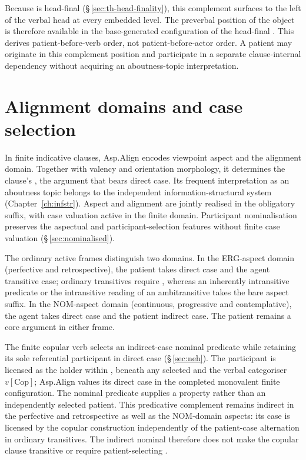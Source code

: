 \noindent Because  is head-final
(§\,\ref{sec:th-head-finality}), this complement surfaces to the left of the
verbal head at every embedded level. The preverbal position of the object is
therefore available in the base-generated configuration of the
head-final . This derives patient-before-verb order, not
patient-before-actor order. A patient may originate in this complement position
and participate in a separate clause-internal dependency without acquiring an
aboutness-topic interpretation.


\section{Alignment domains and case selection}
\label{sec:vm-asp-case}

In finite indicative clauses, Asp.Align encodes viewpoint aspect and the
alignment domain. Together with valency and orientation morphology, it
determines the clause's , the argument that bears
direct case. Its frequent interpretation as an
aboutness topic belongs to the independent information-structural system
(Chapter~\ref{ch:infstr}). Aspect and alignment are jointly realised in the obligatory
suffix, with case valuation active in the finite domain. Participant
nominalisation preserves the aspectual and participant-selection features
without finite case valuation (§\,\ref{sec:nominalised}).

The ordinary active frames distinguish two domains. In the ERG-aspect domain
(perfective and retrospective), the patient takes direct case and the agent
transitive case; ordinary transitives require , whereas an
inherently intransitive predicate or the intransitive reading of an
ambitransitive takes the bare aspect suffix. In the NOM-aspect domain
(continuous, progressive and contemplative), the agent takes direct case and
the patient indirect case. The patient remains a core argument in either frame.

The finite copular verb  selects an indirect-case nominal
predicate while retaining its sole referential participant in direct case
(§\,\ref{sec:neh}). The participant is licensed as the holder within
, beneath any selected  and the verbal
categoriser $v[\mathrm{Cop}]$; Asp.Align values its direct case in the
completed monovalent finite configuration. The nominal predicate supplies
a property rather than an independently selected patient. This predicative
complement remains indirect in the
perfective and retrospective as well as the NOM-domain aspects: its case is
licensed by the copular construction independently of the patient-case
alternation in ordinary transitives. The indirect nominal therefore does
not make the copular clause transitive or require patient-selecting
.

